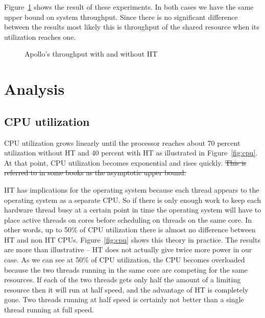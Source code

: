 \documentclass[12pt]{article}
\begin{document}
Figure~\ref{fig:load} shows the result of these experiments. In both cases we have the same upper bound on system throughput. Since there is no significant difference between the results most likely this is throughput of the shared resource when its utilization reaches one.

\begin{figure}[h]
    \centering
	\caption{Apollo's throughput with and without HT}
    \label{fig:load}
\end{figure}

\section{Analysis}

\subsection{CPU utilization}


CPU utilization grows linearly until the processor reaches about 70 percent utilization without HT and 40 percent with HT as illustrated in Figure~\ref{fig:cpu}. At that point, CPU utilization becomes exponential and rises quickly. \sout{This is referred to in some books as the asymptotic upper bound\cite{bound}.} 

HT has implications for the operating system because each thread appears to the operating system as a separate CPU. So if there is only enough work to keep each hardware thread busy at a certain point in time the operating system will have to place active threads on cores before scheduling on threads on the same core. In other words, up to 50\% of CPU utilization there is almost no difference between HT and non HT CPUs. Figure~\ref{fig:cpu} shows this theory in practice. The results are more than illustrative -- HT does not actually give twice more power in our case. As we can see at 50\% of CPU utilization, the CPU becomes overloaded because the two threads running in the same core are competing for the same resources. If each of the two threads gets only half the amount of a limiting resource then it will run at half speed, and the advantage of HT is completely gone. Two threads running at half speed is certainly not better than a single thread running at full speed.
\end{document}
